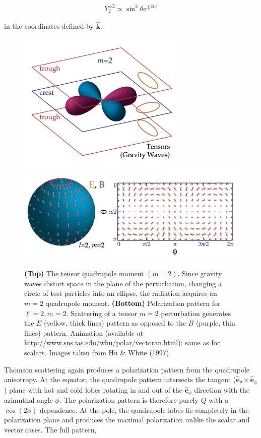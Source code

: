 \documentclass[a4paper,10pt]{article}
\begin{document}
\begin{align*}
    Y_2^{\pm2}\propto\sin^2\theta\mathrm{e}^{\pm2i\phi}
\end{align*}

{\noindent}in the coordinates defined by $\bm{\hat{k}}$.

\begin{figure}[t!]
\centering
\includegraphics[width=8cm]{figures/TensorQuadrupole.png}
\includegraphics[width=15cm]{figures/TensorPattern.png}
\caption{\footnotesize{\textbf{(Top)} The tensor quadrupole moment $(m=2)$. Since gravity waves distort space in the plane of the perturbation, changing a circle of test particles into an ellipse, the radiation acquires an $m=2$ quadrupole moment. \textbf{(Bottom)} Polarization pattern for $\ell=2,m=2$. Scattering of a tensor $m=2$ perturbation generates the $E$ (yellow, thick lines) pattern as opposed to the $B$ (purple, thin lines) pattern. Animation (available at \href{http://www.sns.ias.edu/whu/polar/vectoran.html}{http://www.sns.ias.edu/whu/polar/vectoran.html}): same as for scalars. Images taken from Hu \& White (1997).}}
\label{fig:tensor}
\end{figure}

{\noindent}Thomson scattering again produces a polarization pattern from the quadrupole anisotropy. At the equator, the quadrupole pattern intersects the tangent ($\bm{\hat{e}}_\theta\times\bm{\hat{e}}_\phi$) plane with hot and cold lobes rotating in and out of the $\bm{\hat{e}}_\phi$ direction with the azimuthal angle $\phi$. The polarization pattern is therefore purely $Q$ with a $\cos(2\phi)$ dependence. At the pole, the quadrupole lobes lie completely in the polarization plane and produces the maximal polarization unlike the scalar and vector cases. The full pattern,
\end{document}
